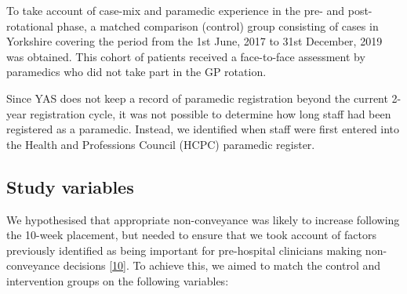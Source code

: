 \documentclass[
  a4paper,
  openany]{article}
\begin{document}
To take account of case-mix and paramedic experience in the pre- and post-rotational phase, a matched comparison (control) group consisting of cases in Yorkshire covering the period from the 1st June, 2017 to 31st December, 2019 was obtained. This cohort of patients received a face-to-face assessment by paramedics who did not take part in the GP rotation.

Since YAS does not keep a record of paramedic registration beyond the current 2-year registration cycle, it was not possible to determine how long staff had been registered as a paramedic. Instead, we identified when staff were first entered into the Health and Professions Council (HCPC) paramedic register.

\hypertarget{study-variables}{%
\subsection*{Study variables}\label{study-variables}}

We hypothesised that appropriate non-conveyance was likely to increase following the 10-week placement, but needed to ensure that we took account of factors previously identified as being important for pre-hospital clinicians making non-conveyance decisions {[}\protect\hyperlink{ref-ocathain_understanding_2018}{10}{]}. To achieve this, we aimed to match the control and intervention groups on the following variables:
\end{document}
